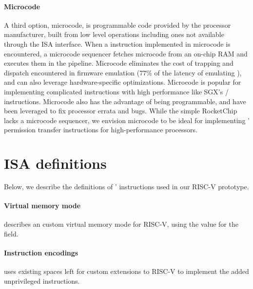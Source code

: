 \paragraph{Microcode}
A third option, microcode, is programmable code provided by the 
processor manufacturer, built from low level operations including ones 
not available through the ISA interface.
When a instruction implemented in microcode is encountered, a microcode
sequencer fetches microcode from an on-chip RAM and executes them in the
pipeline.
Microcode eliminates the cost of trapping and dispatch encountered in 
firmware emulation ($77\%$ of the latency of emulating \scprot),
and can also leverage hardware-specific optimizations.
Microcode is popular for implementing complicated instructions
with high performance like SGX's / instructions.
Microcode also has the advantage of being programmable, and have been
leveraged to fix processor errata and bugs.
While the simple RocketChip lacks a microcode sequencer, 
we envision microcode to be ideal for implementing \seccells'
permission transfer instructions for high-performance processors.


\section{\seccells ISA definitions}
\label{app:seccells:isa_def}
Below, we describe the definitions of \seccells' instructions used in our 
RISC-V prototype.

\paragraph{Virtual memory mode} 
\seccells describes an custom virtual memory mode for RISC-V, using the 
 value for the  field.

\paragraph{Instruction encodings}
\seccells uses existing spaces left for custom extensions to RISC-V to 
implement the added unprivileged instructions.

